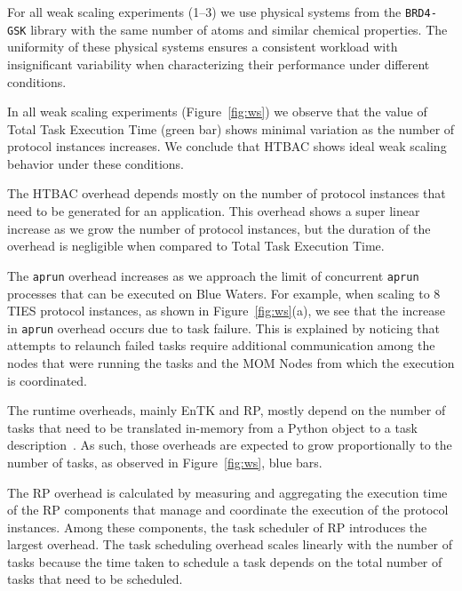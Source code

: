 For all weak scaling experiments (1--3) we use physical systems from the
\texttt{BRD4-GSK} library with the same number of atoms and similar chemical
properties. The uniformity of these physical systems ensures a consistent
workload with insignificant variability when characterizing their performance
under different conditions.


In all weak scaling experiments (Figure~\ref{fig:ws}) we observe that the
value of Total Task Execution Time (green bar) shows minimal variation as the
number of protocol instances increases. We conclude that HTBAC shows ideal
weak scaling behavior under these conditions.

The HTBAC overhead depends mostly on the number of protocol instances that
need to be generated for an application. This overhead shows a super linear
increase as we grow the number of protocol instances, but the duration of the
overhead is negligible when compared to Total Task Execution Time.

The \texttt{aprun} overhead increases as we approach the limit of concurrent
\texttt{aprun} processes that can be executed on Blue Waters. For example,
when scaling to 8 TIES protocol instances, as shown in
Figure~\ref{fig:ws}(a), we see that the increase in \texttt{aprun} overhead
occurs due to task failure. This is explained by noticing that attempts to
relaunch failed tasks require additional communication among the nodes that
were running the tasks and the MOM Nodes from which the execution is
coordinated.

The runtime overheads, mainly EnTK and RP, mostly depend on the number of
tasks that need to be translated in-memory from a Python object to a task
description~\cite{dakka2017,merzky2018}. As such, those overheads are
expected to grow proportionally to the number of tasks, as observed in
Figure~\ref{fig:ws}, blue bars.

The RP overhead is calculated by measuring and aggregating the execution time
of the RP components that manage and coordinate the execution of the protocol
instances. Among these components, the
task scheduler of RP introduces the largest overhead. The task scheduling
overhead scales linearly with the number of tasks because the time taken to
schedule a task depends on the total number of tasks that need to be
scheduled.

